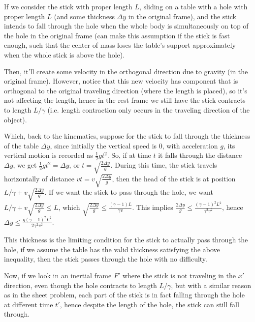 \documentclass{article}
\begin{document}
If we consider the stick with proper length $L$, sliding on a table with a hole with proper length $L$ (and some thickness $\Delta y$ in the original frame), and the stick intends to fall through the hole when the whole body is simultaneously on top of the hole in the original frame (can make this assumption if the stick is fast enough, such that the center of mass loses the table's support approximately when the whole stick is above the hole).

Then, it'll create some velocity in the orthogonal direction due to gravity (in the original frame). However, notice that this new velocity has component that is orthogonal to the original traveling direction (where the length is placed), so it's not affecting the length, hence in the rest frame we still have the stick contracts to length $L/\gamma$ (i.e. length contraction only occurs in the traveling direction of the object). 

Which, back to the kinematics, suppose for the stick to fall through the thickness of the table $\Delta y$, since initially the vertical speed is $0$, with acceleration $g$, its vertical motion is recorded as $\frac{1}{2}gt^2$. So, if at time $t$ it falls through the distance $\Delta y$, we get $\frac{1}{2}gt^2=\Delta y$, or $t=\sqrt{\frac{2\Delta y}{g}}$. During this time, the stick travels horizontally of distance $vt = v\sqrt{\frac{2\Delta y}{g}}$, then the head of the stick is at position $L/\gamma + v\sqrt{\frac{2\Delta y}{g}}$. If we want the stick to pass through the hole, we want $L/\gamma + v\sqrt{\frac{2\Delta y}{g}}\leq L$, which $\sqrt{\frac{2\Delta y}{g}} \leq \frac{(\gamma -1)L}{\gamma v}$. This implies $\frac{2\Delta y}{g} \leq \frac{(\gamma-1)^2L^2}{\gamma^2 v^2}$, hence $\Delta y\leq \frac{g(\gamma-1)^2L^2}{2\gamma^2 v^2}$. 

This thickness is the limiting condition for the stick to actually pass through the hole, if we assume the table has the valid thickness satisfying the above inequality, then the stick passes through the hole with no difficulty. 

Now, if we look in an inertial frame $F'$ where the stick is not traveling in the $x'$ direction, even though the hole contracts to length $L/\gamma$, but with a similar reason as in the sheet problem, each part of the stick is in fact falling through the hole at different time $t'$, hence despite the length of the hole, the stick can still fall through.

\break
\end{document}
